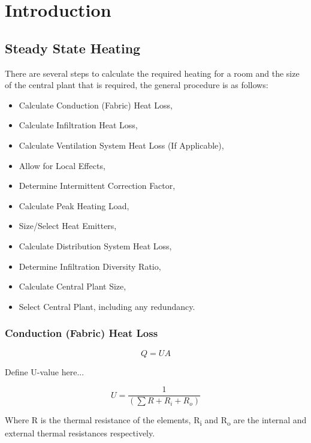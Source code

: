\chapter{Introduction}
\label{chp:HCIntro}

\section{Steady State Heating}
\label{sec:HCSSHeatLoss}

There are several steps to calculate the required heating for a room and the size of the central plant that is required, the general procedure is as follows:

\begin{itemize}
\item Calculate Conduction (Fabric) Heat Loss,
\item Calculate Infiltration Heat Loss,
\item Calculate Ventilation System Heat Loss (If Applicable),
\item Allow for Local Effects,
\item Determine Intermittent Correction Factor,
\item Calculate Peak Heating Load,
\item Size/Select Heat Emitters,
\item Calculate Distribution System Heat Loss,
\item Determine Infiltration Diversity Ratio,
\item Calculate Central Plant Size,
\item Select Central Plant, including any redundancy.
\end{itemize}

\subsection{Conduction (Fabric) Heat Loss}

\begin{equation}\label{eq:HeatUValue}
Q = U A
\end{equation}

Define U-value here...

\begin{equation}\label{eq:UValueDef}
U = \frac{1}{(\sum R + R_i + R_o)}
\end{equation}

Where R is the thermal resistance of the elements, R\textsubscript{i} and R\textsubscript{o} are the internal and external thermal resistances respectively.

